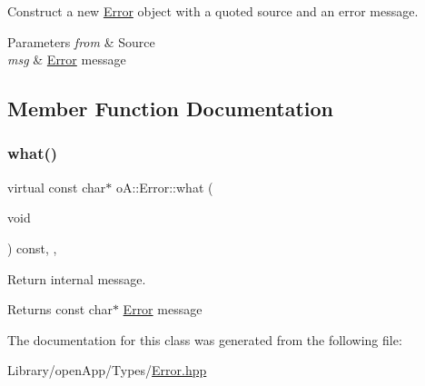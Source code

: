 Construct a new \mbox{\hyperlink{classo_a_1_1_error}{Error}} object with a quoted source and an error message. 


\begin{DoxyParams}{Parameters}
{\em from} & Source \\
\hline
{\em msg} & \mbox{\hyperlink{classo_a_1_1_error}{Error}} message \\
\hline
\end{DoxyParams}


\subsection{Member Function Documentation}
\mbox{\label{classo_a_1_1_error_aaef80480c87b91b1a34853c791b649ef}} 
\subsubsection{\texorpdfstring{what()}{what()}}
{\footnotesize\ttfamily virtual const char$\ast$ o\+A\+::\+Error\+::what (\begin{DoxyParamCaption}\item[{void}]{ }\end{DoxyParamCaption}) const\hspace{0.3cm}{\ttfamily [inline]}, {\ttfamily [virtual]}, {\ttfamily [noexcept]}}



Return internal message. 

\begin{DoxyReturn}{Returns}
const char$\ast$ \mbox{\hyperlink{classo_a_1_1_error}{Error}} message 
\end{DoxyReturn}


The documentation for this class was generated from the following file\+:\begin{DoxyCompactItemize}
\item 
Library/open\+App/\+Types/\mbox{\hyperlink{_error_8hpp}{Error.\+hpp}}\end{DoxyCompactItemize}
